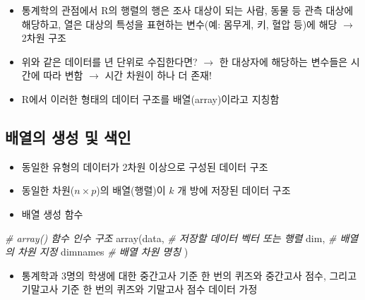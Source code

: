 \documentclass[
  11pt,
]{krantz}
\newenvironment{Shaded}{\begin{snugshade}}{\end{snugshade}}
\newcommand{\CommentTok}[1]{\textcolor[rgb]{0.37,0.37,0.37}{\textit{#1}}}
\newcommand{\FunctionTok}[1]{\textcolor[rgb]{0,0,0}{#1}}
\newcommand{\NormalTok}[1]{#1}
\providecommand{\tightlist}{%
  \setlength{\itemsep}{0pt}\setlength{\parskip}{0pt}}
\begin{document}
\begin{itemize}
\tightlist
\item
  통계학의 관점에서 R의 행렬의 행은 조사 대상이 되는 사람, 동물 등 관측 대상에 해당하고, 열은 대상의 특성을 표현하는 변수(예: 몸무게, 키, 혈압 등)에 해당 \(\rightarrow\) 2차원 구조
\item
  위와 같은 데이터를 년 단위로 수집한다면? \(\rightarrow\) 한 대상자에 해당하는 변수들은 시간에 따라 변함 \(\rightarrow\) 시간 차원이 하나 더 존재!
\item
  R에서 이러한 형태의 데이터 구조를 배열(array)이라고 지칭함
\end{itemize}

\hypertarget{make-array}{%
\subsection{배열의 생성 및 색인}\label{make-array}}

\begin{itemize}
\tightlist
\item
  동일한 유형의 데이터가 2차원 이상으로 구성된 데이터 구조
\item
  동일한 차원(\(n\times p\))의 배열(행렬)이 \(k\) 개 방에 저장된 데이터 구조
\item
  배열 생성 함수
\end{itemize}

\footnotesize

\begin{Shaded}
\begin{Highlighting}[]
\CommentTok{\# array() 함수 인수 구조}
\FunctionTok{array}\NormalTok{(data, }\CommentTok{\# 저장할 데이터 벡터 또는 행렬}
\NormalTok{      dim,  }\CommentTok{\# 배열의 차원 지정}
\NormalTok{      dimnames }\CommentTok{\# 배열 차원 명칭}
\NormalTok{      )}
\end{Highlighting}
\end{Shaded}

\normalsize

\begin{itemize}
\tightlist
\item
  통계학과 3명의 학생에 대한 중간고사 기준 한 번의 퀴즈와 중간고사 점수, 그리고 기말고사 기준 한 번의 퀴즈와 기말고사 점수 데이터 가정
\end{itemize}

\footnotesize
\end{document}
